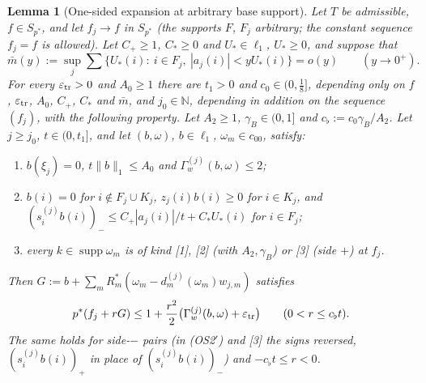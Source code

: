 \documentclass[10pt]{amsart}
\newtheorem{lemma}[theorem]{Lemma}
\theoremstyle{definition}
\theoremstyle{remark}
\newcommand{\supp}{\operatorname{supp}}
\newcommand{\N}{\mathbb N}
\begin{document}
\begin{lemma}[One-sided expansion at arbitrary base support]
\label{lem:II-Uinf}
Let $T$ be admissible, $f\in S_{p^*}$, and let $f_j\to f$ in $S_{p^*}$
\textup{(}the supports $F$, $F_j$ arbitrary; the constant sequence $f_j=f$
is allowed\textup{)}.  Let $C_+\ge1$, $C_*\ge0$ and $U_*\in\ell_1$,
$U_*\ge0$, and suppose that
\[
 \bar m(y):=\sup_j\sum\{U_*(i):\ i\in F_j,\ |a_j(i)|<yU_*(i)\}=o(y)\qquad
 (y\to0^+).
\]
For every $\varepsilon_{\rm tr}>0$ and $A_0\ge1$ there are $t_1>0$ and
$c_0\in(0,\frac18]$, depending only on $f$, $\varepsilon_{\rm tr}$, $A_0$,
$C_+$, $C_*$ and $\bar m$, and $j_0\in\N$, depending in addition on the
sequence $(f_j)$, with the following property.  Let
$A_2\ge1$, $\gamma_B\in(0,1]$ and $c_\flat:=c_0\gamma_B/A_2$.  Let $j\ge j_0$,
$t\in(0,t_1]$, and let $(b,\omega)$, $b\in\ell_1$, $\omega_m\in c_{00}$,
satisfy:
\begin{enumerate}
\item[(OS1)] $b(\xi_j)=0$, $t\|b\|_1\le A_0$ and $\Gamma^{(j)}_w(b,\omega)\le2$;
\item[(OS2$'$)] $b(i)=0$ for $i\notin F_j\cup K_j$, $z_j(i)b(i)\ge0$ for
$i\in K_j$, and $(s^{(j)}_ib(i))_-\le C_+|a_j(i)|/t+C_*U_*(i)$ for $i\in F_j$;
\item[(OS3)] every $k\in\supp\omega_m$ is of kind \textup{[1]},
\textup{[2]} \textup{(}with $A_2,\gamma_B$\textup{)} or \textup{[3]}
\textup{(}side $+$\textup{)} at $f_j$.
\end{enumerate}
Then $G:=b+\sum_mR_m^*(\omega_m-d^{(j)}_m(\omega_m)w_{j,m})$ satisfies
\[
 p^*(f_j+rG)\le1+\frac{r^2}2\big(\Gamma^{(j)}_w(b,\omega)+\varepsilon_{\rm tr}
 \big)\qquad(0<r\le c_\flat t).
\]
The same holds for side-$-$ pairs \textup{(}in \textup{(OS2$'$)} and
\textup{[3]} the signs reversed, $(s^{(j)}_ib(i))_+$ in place of
$(s^{(j)}_ib(i))_-$\textup{)} and $-c_\flat t\le r<0$.
\end{lemma}
\end{document}
